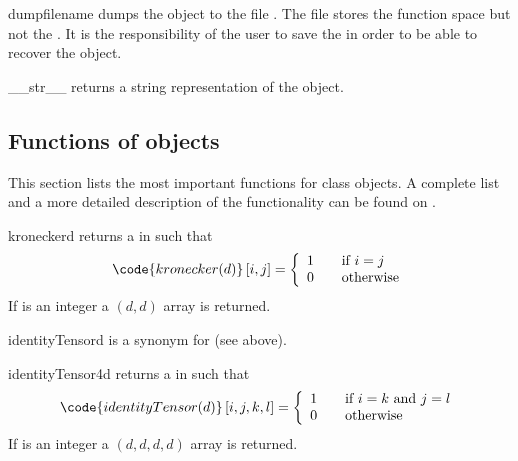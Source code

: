 \begin{methoddesc}[Data]{dump}{filename}
dumps the \Data object to the file . The file stores the
function space but not the \Domain. It is the responsibility of the user to
save the \Domain in order to be able to recover the \Data object.
\end{methoddesc}

\begin{methoddesc}[Data]{__str__}{}
returns a string representation of the object.
\end{methoddesc}

\subsection{Functions of \Data objects}
This section lists the most important functions for \Data class objects.
A complete list and a more detailed description of the functionality can be
found on \ReferenceGuide.

\begin{funcdesc}{kronecker}{d}
returns a \RankTwo in \FunctionSpace {} such that
\begin{equation}
\code{kronecker(d)}\left[ i,j\right] = \left\{
\begin{array}{l l}
    1 & \quad \text{if $i=j$}\\
    0 & \quad \text{otherwise}
\end{array}
\right.
\end{equation}
If  is an integer a $(d,d)$ \numpy array is returned.
\end{funcdesc}

\begin{funcdesc}{identityTensor}{d}
is a synonym for  (see above).
\end{funcdesc}

\begin{funcdesc}{identityTensor4}{d}
returns a \RankFour in \FunctionSpace {} such that
\begin{equation}
\code{identityTensor(d)}\left[ i,j,k,l\right] = \left\{
\begin{array}{l l}
    1 & \quad \text{if $i=k$ and $j=l$}\\
    0 & \quad \text{otherwise}
\end{array}
\right.
\end{equation}
If  is an integer a $(d,d,d,d)$ \numpy array is returned.
\end{funcdesc}

